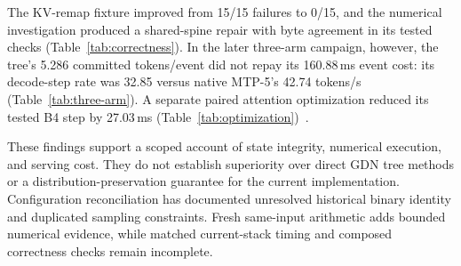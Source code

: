 \documentclass[conference]{IEEEtran}
\begin{document}
The KV-remap fixture improved from 15/15 failures to 0/15, and the numerical investigation produced a shared-spine repair with byte agreement in its tested checks (Table~\ref{tab:correctness}). In the later three-arm campaign, however, the tree's 5.286 committed tokens/event did not repay its 160.88\,ms event cost: its decode-step rate was 32.85 versus native MTP-5's 42.74 tokens/s (Table~\ref{tab:three-arm}). A separate paired attention optimization reduced its tested B4 step by 27.03\,ms (Table~\ref{tab:optimization})~\cite{lumo2026archive}.

These findings support a scoped account of state integrity, numerical execution, and serving cost. They do not establish superiority over direct GDN tree methods or a distribution-preservation guarantee for the current implementation. Configuration reconciliation has documented unresolved historical binary identity and duplicated sampling constraints. Fresh same-input arithmetic adds bounded numerical evidence, while matched current-stack timing and composed correctness checks remain incomplete.

\label{ReferencesStart}


\end{document}
